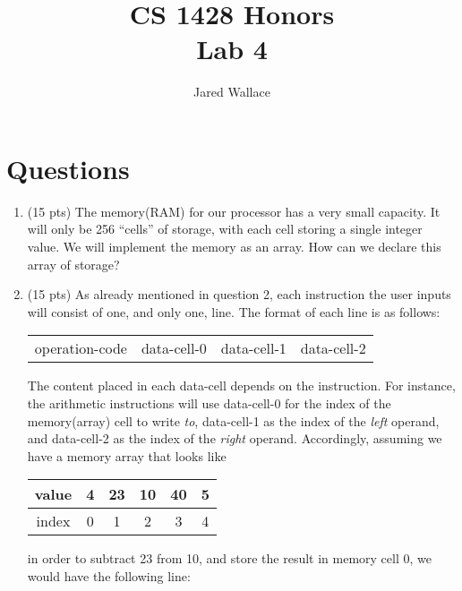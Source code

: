 \documentclass[letterpaper,12pt]{article}
\title{\Large CS 1428 Honors\\Lab 4}
\author{Jared Wallace}
\date{}
\begin{document}
\maketitle

\vspace{30mm}

\section*{Questions}

\begin{enumerate}
    \item (15 pts) The memory(RAM) for our processor has a very small capacity. It will only be 256
                   “cells” of storage, with each cell storing a single integer value. We will implement
                   the memory as an array. How can we declare this array of storage?
    \item (15 pts) As already mentioned in question 2, each instruction the user inputs will consist of
                   one, and only one, line. The format of each line is as follows:
    \begin{table}[H]
    \begin{center}
        \begin{tabular}{c|c|c|c}
            operation-code & data-cell-0 & data-cell-1 & data-cell-2
        \end{tabular}
    \end{center}
    \end{table}
                   The content placed in each data-cell depends on the instruction. For instance,
                   the arithmetic instructions will use data-cell-0 for the index of the memory(array)
                   cell to write \emph{to}, data-cell-1 as the index of the \emph{left} operand, and data-cell-2 as
                   the index of the \emph{right} operand. Accordingly, assuming we have a memory array that looks
                   like
    \begin{table}[H]
    \begin{center}
        \begin{tabular}{|c|c|c|c|c|c|}
            \hline
            value & 4 & 23 & 10 & 40 & 5\\ \hline
            index & 0 & 1 & 2 & 3 & 4 \\ \hline
        \end{tabular}
    \end{center}
    \end{table}
                   in order to subtract 23 from 10, and store the result in memory cell 0, we would
                   have the following line:


\end{enumerate}
\end{document}
